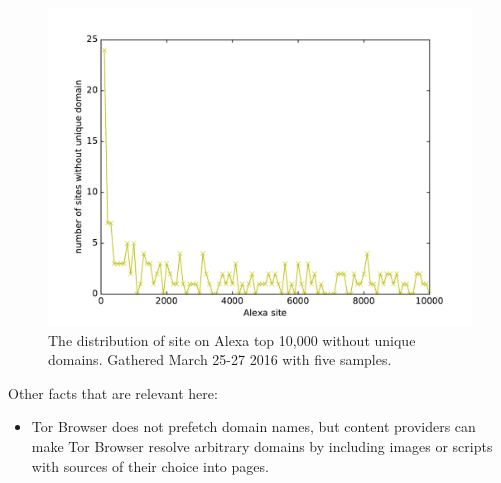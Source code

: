 \begin{figure}[t]
	\centering
	\includegraphics[width=\linewidth]{figures/dns-unique-domains}
	\caption{The distribution of site on Alexa top 10,000 without unique domains.
	Gathered March 25-27 2016 with five samples.}
	\label{fig:dns-unique-domains-ff}
\end{figure}

Other facts that are relevant here:
\begin{itemize}
	\item Tor Browser does not prefetch domain names, but content providers can
	make Tor Browser resolve arbitrary domains by including images or scripts
	with sources of their choice into pages. 
\end{itemize}
